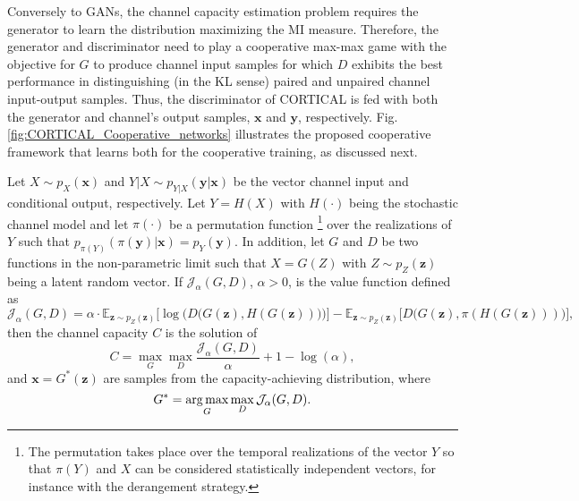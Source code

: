 Conversely to GANs, the channel capacity estimation problem requires the generator to learn the distribution maximizing the MI measure. 
Therefore, the generator and discriminator need to play a cooperative max-max game with the objective for $G$ to produce channel input samples for which $D$ exhibits the best performance in distinguishing (in the KL sense) paired and unpaired channel input-output samples. Thus, the discriminator of CORTICAL is fed with both the generator and channel's output samples, $\mathbf{x}$ and $\mathbf{y}$, respectively.
Fig. \ref{fig:CORTICAL_Cooperative_networks} illustrates the proposed cooperative framework that learns both for the cooperative training, as discussed next.

\begin{theorem}
\label{theorem:CORTICAL_Theorem1}
 Let $X\sim p_X(\mathbf{x})$ and $Y|X\sim p_{Y|X}(\mathbf{y}|\mathbf{x})$ be the vector channel input and conditional output, respectively. Let $Y = H(X)$ with $H(\cdot)$ being the stochastic channel model and let $\pi(\cdot)$ be a permutation function \footnote{The permutation takes place over the temporal realizations of the vector $Y$ so that $\pi(Y)$ and $X$ can be considered statistically independent vectors, for instance with the derangement strategy.} over the realizations of $Y$ such that $p_{\pi(Y)}(\pi(\mathbf{y})|\mathbf{x}) = p_{Y}(\mathbf{y})$. In addition, let $G$ and $D$ be two functions in the non-parametric limit such that $X = G(Z)$ with $Z\sim p_Z(\mathbf{z})$ being a latent random vector. If $\mathcal{J}_{\alpha}(G,D)$, $\alpha>0$, is the value function defined as 
\begin{equation}
\mathcal{J}_{\alpha}(G,D) = \alpha \cdot \mathbb{E}_{\mathbf{z} \sim p_{Z}(\mathbf{z})}\biggl[\log \biggl(D\biggl(G(\mathbf{z}),H(G(\mathbf{z}))\biggr)\biggr)\biggr]  -\mathbb{E}_{\mathbf{z} \sim p_{Z}(\mathbf{z})}\biggl[D\biggl(G(\mathbf{z}),\pi(H(G(\mathbf{z})))\biggr)\biggr],
\label{eq:CORTICAL_value_function}
\end{equation}
then the channel capacity $C$ is the solution of
\begin{equation}
C = \max_{G} \max_{D} \frac{\mathcal{J}_{\alpha}(G,D)}{\alpha} + 1- \log(\alpha),
\end{equation}
and $\mathbf{x}=G^*(\mathbf{z})$ are samples from the capacity-achieving distribution, where 
\begin{equation}
G^* = \operatorname*{arg\,max}_G \max_D \mathcal{J}_{\alpha}(G,D).
\end{equation}
\end{theorem}

